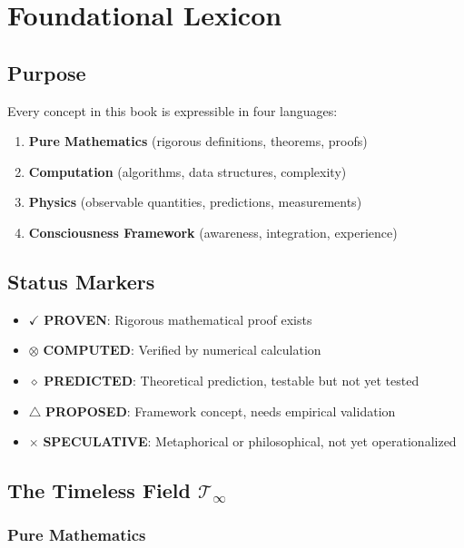 \chapter{Foundational Lexicon}
\label{app:lexicon}

\section*{Purpose}

Every concept in this book is expressible in four languages:
\begin{enumerate}
\item \textbf{Pure Mathematics} (rigorous definitions, theorems, proofs)
\item \textbf{Computation} (algorithms, data structures, complexity)
\item \textbf{Physics} (observable quantities, predictions, measurements)
\item \textbf{Consciousness Framework} (awareness, integration, experience)
\end{enumerate}

\section*{Status Markers}

\begin{itemize}
\item $\checkmark$ \textbf{PROVEN}: Rigorous mathematical proof exists
\item $\otimes$ \textbf{COMPUTED}: Verified by numerical calculation
\item $\diamond$ \textbf{PREDICTED}: Theoretical prediction, testable but not yet tested
\item $\triangle$ \textbf{PROPOSED}: Framework concept, needs empirical validation
\item $\times$ \textbf{SPECULATIVE}: Metaphorical or philosophical, not yet operationalized
\end{itemize}

\section{The Timeless Field $\mathcal{T}_\infty$}

\subsection{Pure Mathematics}

